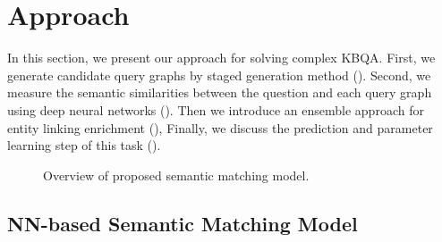 \section{Approach}

In this section, we present our approach for solving complex KBQA.
First, we generate candidate query graphs by staged generation method ().
Second, we measure the semantic similarities between the question and each query graph using deep neural networks ().
Then we introduce an ensemble approach for entity linking enrichment (),
Finally, we discuss the prediction and parameter learning step of this task ().


 


\begin{figure*}[ht]
	\centering
	\caption{Overview of proposed semantic matching model.}
	\label{fig:nn}
\end{figure*}


\subsection{NN-based Semantic Matching Model}
\label{sec:rm}

